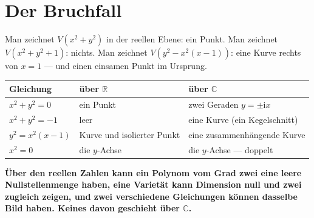 \section{Der Bruchfall}

\begin{warnung}
Man zeichnet $V(x^{2} + y^{2})$ in der reellen Ebene: ein Punkt. Man zeichnet $V(x^{2} + y^{2} + 1)$: nichts. Man zeichnet $V(y^{2} - x^{2}(x - 1))$: eine Kurve rechts von $x = 1$ --- und einen einsamen Punkt im Ursprung.

\begin{center}
{\small
\renewcommand{\arraystretch}{1.5}
\begin{tabular}{@{}P{3.0cm}P{2.6cm}P{2.8cm}@{}}
\toprule
\textbf{Gleichung} & \textbf{über $\mathbb R$} & \textbf{über $\mathbb C$}\\
\midrule
$x^{2} + y^{2} = 0$ & ein Punkt & zwei Geraden $y = \pm\mathrm ix$\\
$x^{2} + y^{2} = -1$ & leer & eine Kurve (ein Kegelschnitt)\\
$y^{2} = x^{2}(x-1)$ & Kurve und isolierter Punkt & eine zusammenhängende Kurve\\
$x^{2} = 0$ & die $y$-Achse & die $y$-Achse --- doppelt\\
\bottomrule
\end{tabular}}
\end{center}

\begin{center}
\begin{minipage}{0.9\textwidth}
\textbf{Über den reellen Zahlen kann ein Polynom vom Grad zwei eine leere Nullstellenmenge haben, eine Varietät kann Dimension null und zwei zugleich zeigen, und zwei verschiedene Gleichungen können dasselbe Bild haben. Keines davon geschieht über $\mathbb C$.}
\end{minipage}
\end{center}

\begin{center}
\begin{minipage}{0.88\textwidth}
\end{minipage}
\end{center}
\end{warnung}

